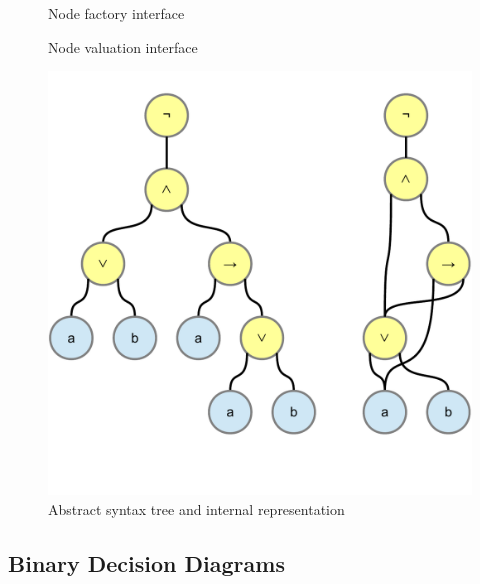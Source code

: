 \begin{figure}[htbp]
\begin{center}
\caption{Node factory interface}
\label{fig:NyayaNodeCreation}
\end{center}
\end{figure}

\begin{figure}[htbp]
\begin{center}
\caption{Node valuation interface}
\label{fig:NyayaNodeValuation}
\end{center}
\end{figure}



\begin{figure}[htbp]
\begin{center}
\includegraphics[scale=0.5]{diagrams/AcyclicSyntaxGraph.pdf}
\caption{Abstract syntax tree and internal representation}
\label{fig:NyayaNodeDisplay}
\end{center}
\end{figure}

\subsection{Binary Decision Diagrams}

